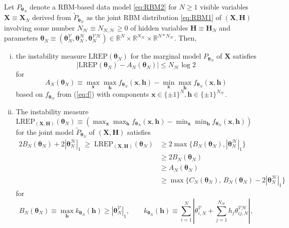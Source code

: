 \documentclass[]{article}
\theoremstyle{definition}
\newcommand{\REP}{\mathrm{LREP}}
\newcommand{\elt}{A_{N}(\boldsymbol \theta_N) }
\newcommand{\Gam}{B_{N}(\boldsymbol \theta_N) }
\newcommand{\Gamc}{C_{N}(\boldsymbol \theta_N) }
\begin{document}
\protect\hypertarget{prp:prop2}{}{\label{prp:prop2} }Let
\(P_{\boldsymbol \theta_N}\) denote a RBM-based data model \eqref{eq:RBM2}
for \(N\geq 1\) visible variables
\(\boldsymbol X \equiv \boldsymbol X_N\) derived from
\(\tilde{P}_{\boldsymbol \theta_N}\) as the joint RBM distribution
\eqref{eq:RBM1} of \((\boldsymbol X, \boldsymbol H)\) involving some
number \(N_{\mathcal{H}} \equiv N_{N,\mathcal{H}}\geq 0\) of hidden
variables \(\boldsymbol H \equiv \boldsymbol H_N\) and parameters
\(\boldsymbol \theta_N \equiv (\boldsymbol \theta_N^{\mathcal{V}},\boldsymbol \theta_N^{\mathcal{H}}, \boldsymbol \theta_N^{\mathcal{VH}}) \in\mathbb{R}^{N}\times \mathbb{R}^{N_{\mathcal{H}}} \times \mathbb{R}^{N*N_{\mathcal{H}}}\).
Then,
\begin{enumerate}[(i)]
\item the instability measure $\REP(\boldsymbol \theta_N)$ for the marginal model $P_{\boldsymbol \theta_N}$ of  $\boldsymbol X$ satisfies
    $$
    \left| \REP(\boldsymbol \theta_N)  - \elt\right| \leq    N_{\mathcal{H}}  \log 2
    $$
    for
    $$
    \elt  \equiv   \max_{ \boldsymbol x} \max_{ \boldsymbol h  } f_{\boldsymbol \theta_N} (\boldsymbol x, \boldsymbol h)-\min_{ \boldsymbol x } \max_{ \boldsymbol h }f_{\boldsymbol \theta_N} (\boldsymbol x, \boldsymbol h)
    $$
    based on $f_{\boldsymbol \theta_N}$ from (\ref{eq:f}) with components $\boldsymbol x \in \{\pm 1\}^{N}, \boldsymbol h \in \{\pm 1\}^{N_{\mathcal{H}}}$.
\item The instability measure $\REP_{(\boldsymbol X, \boldsymbol H)}(\boldsymbol \theta_N)\equiv \left(\max_{ \boldsymbol x} \max_{ \boldsymbol h  } f_{\boldsymbol \theta_N} (\boldsymbol x, \boldsymbol h)-\min_{ \boldsymbol x } \min_{ \boldsymbol h }f_{\boldsymbol \theta_N} (\boldsymbol x, \boldsymbol h)\right)$ for the joint model $\tilde{P}_{\boldsymbol \theta_N}$ of $(\boldsymbol X, \boldsymbol H)$ satisfies
    \begin{align*}
    2\Gam +  2|\boldsymbol \theta_N^{\mathcal{H}} |_{1} \; \geq \; \REP_{(\boldsymbol X, \boldsymbol H)}(\boldsymbol \theta_N)    & \geq 
    2\max\big\{\Gam,   |\boldsymbol \theta_N^{\mathcal{H}} |_{1}\big\} \\
    &\geq  2\Gam\\
    &\geq  \elt\\
    &\geq   \max\big\{  \Gamc, \, \Gam  - 2|\boldsymbol \theta_N^{\mathcal{H}} |_{1}  \big\}
    \end{align*}
    for
    $$
    \Gam \equiv \max_{ \boldsymbol h} k_{\boldsymbol \theta_N} (\boldsymbol h)
    \geq  |\boldsymbol \theta_N^{\mathcal{V}} |_{1},\qquad  k_{\boldsymbol \theta_N} (\boldsymbol h)  \equiv \sum_{i=1}^{N }\left| \theta_{i,N}^{\mathcal{V}}   + \sum_{j=1}^{N_{\mathcal{H}}} h_j \theta_{ij,N}^{\mathcal{VH}} \right|,
$$
\end{enumerate}
\end{document}
